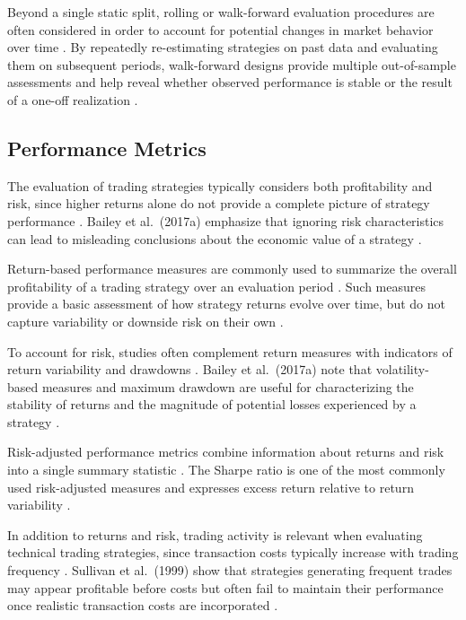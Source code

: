 Beyond a single static split, rolling or walk-forward evaluation procedures are
often considered in order to account for potential changes in market behavior
over time \citep{bailey2017probability}. By repeatedly re-estimating strategies
on past data and evaluating them on subsequent periods, walk-forward designs
provide multiple out-of-sample assessments and help reveal whether observed
performance is stable or the result of a one-off realization
\citep{bailey2017probability}.

\subsection{Performance Metrics}

The evaluation of trading strategies typically considers both profitability and
risk, since higher returns alone do not provide a complete picture of strategy
performance \citep{bailey2017probability}. Bailey et al.~(2017a) emphasize that
ignoring risk characteristics can lead to misleading conclusions about the
economic value of a strategy \citep{bailey2017probability}.

Return-based performance measures are commonly used to summarize the overall
profitability of a trading strategy over an evaluation period
\citep{bailey2017probability}. Such measures provide a basic assessment of how
strategy returns evolve over time, but do not capture variability or downside
risk on their own \citep{bailey2017probability}.

To account for risk, studies often complement return measures with indicators
of return variability and drawdowns \citep{bailey2017probability}. Bailey et
al.~(2017a) note that volatility-based measures and maximum drawdown are useful
for characterizing the stability of returns and the magnitude of potential
losses experienced by a strategy \citep{bailey2017probability}.

Risk-adjusted performance metrics combine information about returns and risk
into a single summary statistic \citep{bailey2017probability}. The Sharpe ratio
is one of the most commonly used risk-adjusted measures and expresses excess
return relative to return variability \citep{bailey2017probability}.

In addition to returns and risk, trading activity is relevant when evaluating
technical trading strategies, since transaction costs typically increase with
trading frequency \citep{sullivan1999data}. Sullivan et al.~(1999) show that
strategies generating frequent trades may appear profitable before costs but
often fail to maintain their performance once realistic transaction costs are
incorporated \citep{sullivan1999data}.

